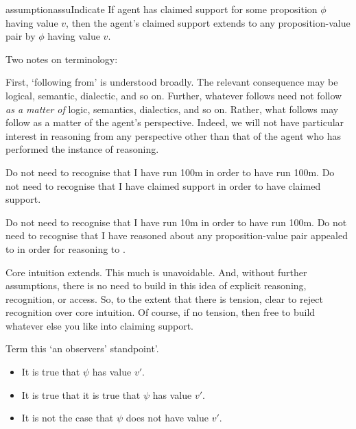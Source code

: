 \begin{note}
  \begin{restatable}[\indicateN{2}]{assumption}{assuIndicate}
    \label{assu:indication}
    If agent has claimed support for some proposition \(\phi\) having value \(v\), then the agent's claimed support extends to any proposition-value pair \indicateVed{} by \(\phi\) having value \(v\).
  \end{restatable}
\end{note}

\begin{note}
  Two notes on terminology:

  First, `following from' is understood broadly.
  The relevant consequence may be logical, semantic, dialectic, and so on.
  Further, whatever follows need not follow \emph{as a matter of} logic, semantics, dialectics, and so on.
  Rather, what follows may follow as a matter of the agent's perspective.
  Indeed, we will not have particular interest in reasoning from any perspective other than that of the agent who has performed the instance of reasoning.
\end{note}

\begin{note}
  Do not need to recognise that I have run 100m in order to have run 100m.
  Do not need to recognise that I have claimed support in order to have claimed support.

  Do not need to recognise that I have run 10m in order to have run 100m.
  Do not need to recognise that I have reasoned about any proposition-value pair appealed to in order for reasoning to .

  Core intuition extends.
  This much is unavoidable.
  And, without further assumptions, there is no need to build in this idea of explicit reasoning, recognition, or access.
  So, to the extent that there is tension, clear to reject recognition over core intuition.
  Of course, if no tension, then free to build whatever else you like into claiming support.

  Term this `an observers' standpoint'.
\end{note}

\begin{note}
  \begin{itemize}
    \item It is true that \(\psi\) has value \(v'\).
    \item It is true that it is true that \(\psi\) has value \(v'\).
    \item It is not the case that \(\psi\) does not have value \(v'\).
    \end{itemize}
\end{note}

